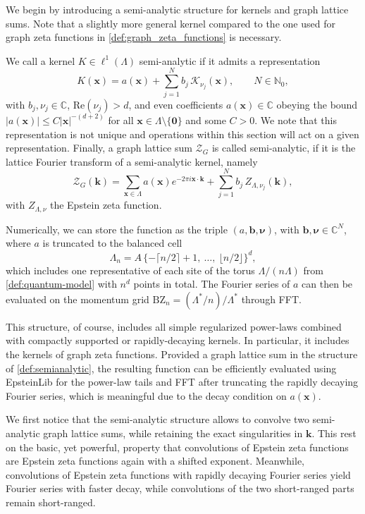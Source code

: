 \documentclass[]{amsart}
\numberwithin{mythm}{section}
\begin{document}
We begin by introducing a semi-analytic structure for kernels and graph lattice sums. Note that a slightly more general kernel compared to the one used for graph zeta functions in \cref{def:graph_zeta_functions} is necessary.
\begin{definition}
\label{def:semianalytic}
We call a kernel $K\in\ell^1(\Lambda)$ semi-analytic if it admits a
representation
\[
K(\bm x)=a(\bm x)+\sum_{j=1}^{N}b_j\,\mathcal K_{\nu_j}(\bm x),
\qquad N\in\mathds N_0,
\]
with $b_j,\nu_j\in\mathds C$, $\mathrm{Re}(\nu_j)>d$, and even coefficients $a(\bm x)\in\mathds C$ obeying the bound $|a(\bm x)|\le C|\bm x|^{-(d+2)}$ for all $\bm x\in\Lambda\setminus\{\bm 0\}$ and some $C>0$. We note that this representation is not unique and operations within this section will act on a given representation. Finally, a graph lattice sum $\mathcal Z_G$ is called semi-analytic, if it is the lattice Fourier transform of a semi-analytic kernel, namely
\[
\mathcal Z_G(\bm k)=\sum_{\bm x\in\Lambda}a(\bm x)e^{-2\pi i\bm x\cdot\bm k}
+\sum_{j=1}^{N}b_j\,Z_{\Lambda,\nu_j}(\bm k),
\]
with $Z_{\Lambda,\nu}$ the Epstein zeta function.
\end{definition}
Numerically, we can store the function as the triple $(a,\bm b,\bm\nu)$, with $\bm b,\bm\nu\in\mathds C^N$, where $a$ is truncated to the balanced cell
\[
\Lambda_n=A\,\{-\lceil n/2\rceil+1,\ \dots,\ \lfloor n/2\rfloor\}^d,
\]
which includes one representative of each site of the torus $\Lambda/(n\Lambda)$ from \cref{def:quantum-model} with $n^d$ points in total. The Fourier series of $a$ can then be evaluated on the momentum grid $\mathrm{BZ}_n=(\Lambda^\ast/n)/\Lambda^\ast$ through FFT.

This structure, of course, includes all simple regularized power-laws combined with compactly supported or rapidly-decaying kernels. In particular, it includes the kernels of graph zeta functions. Provided a graph lattice sum in the structure of \cref{def:semianalytic}, the resulting function can be efficiently evaluated using EpsteinLib for the power-law tails and FFT after truncating the rapidly decaying Fourier series, which is meaningful due to the decay condition on $a(\bm x)$.

We first notice that the semi-analytic structure allows to convolve two semi-analytic graph lattice sums, while retaining the exact singularities in $\bm k$. This rest on the basic, yet powerful, property that convolutions of Epstein zeta functions are Epstein zeta functions again with a shifted exponent. Meanwhile, convolutions of Epstein zeta functions with rapidly decaying Fourier series yield Fourier series with faster decay, while convolutions of the two short-ranged parts remain short-ranged.
\end{document}
